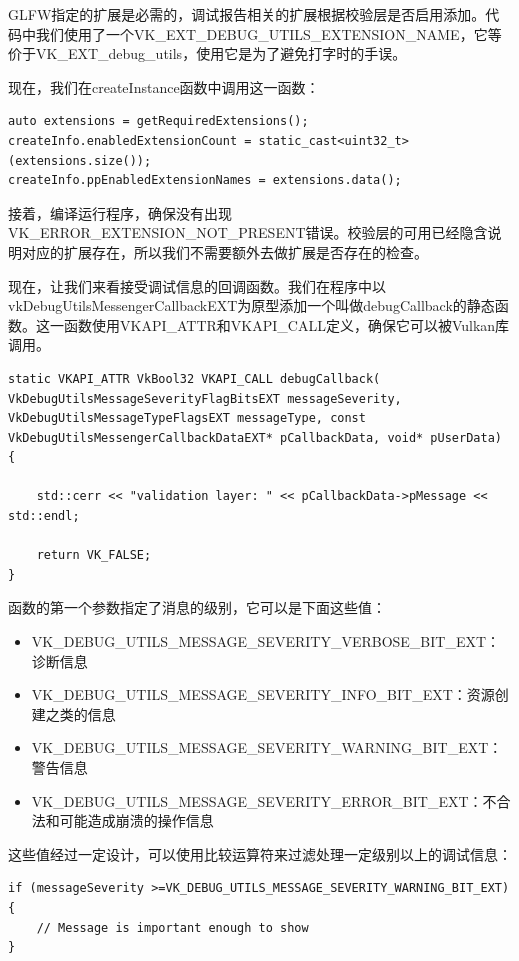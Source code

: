 \documentclass{ctexart}
\begin{document}
GLFW指定的扩展是必需的，调试报告相关的扩展根据校验层是否启用添加。代码中我们使用了一个VK\_EXT\_DEBUG\_UTILS\_EXTENSION\_NAME，它等价于VK\_EXT\_debug\_utils，使用它是为了避免打字时的手误。

现在，我们在createInstance函数中调用这一函数：

\begin{lstlisting}[language={[ANSI]C}]
auto extensions = getRequiredExtensions();
createInfo.enabledExtensionCount = static_cast<uint32_t>(extensions.size());
createInfo.ppEnabledExtensionNames = extensions.data();
\end{lstlisting}

接着，编译运行程序，确保没有出现VK\_ERROR\_EXTENSION\_NOT\_PRESENT错误。校验层的可用已经隐含说明对应的扩展存在，所以我们不需要额外去做扩展是否存在的检查。

现在，让我们来看接受调试信息的回调函数。我们在程序中以vkDebugUtilsMessengerCallbackEXT为原型添加一个叫做debugCallback的静态函数。这一函数使用VKAPI\_ATTR和VKAPI\_CALL定义，确保它可以被Vulkan库调用。

\begin{lstlisting}[language={[ANSI]C}]
static VKAPI_ATTR VkBool32 VKAPI_CALL debugCallback( VkDebugUtilsMessageSeverityFlagBitsEXT messageSeverity, VkDebugUtilsMessageTypeFlagsEXT messageType, const VkDebugUtilsMessengerCallbackDataEXT* pCallbackData, void* pUserData) {

	std::cerr << "validation layer: " << pCallbackData->pMessage << std::endl;

	return VK_FALSE;
}
\end{lstlisting}

函数的第一个参数指定了消息的级别，它可以是下面这些值：

\begin{itemize}
	\item VK\_DEBUG\_UTILS\_MESSAGE\_SEVERITY\_VERBOSE\_BIT\_EXT：诊断信息
	\item VK\_DEBUG\_UTILS\_MESSAGE\_SEVERITY\_INFO\_BIT\_EXT：资源创建之类的信息
	\item VK\_DEBUG\_UTILS\_MESSAGE\_SEVERITY\_WARNING\_BIT\_EXT：警告信息
	\item VK\_DEBUG\_UTILS\_MESSAGE\_SEVERITY\_ERROR\_BIT\_EXT：不合法和可能造成崩溃的操作信息
\end{itemize}

这些值经过一定设计，可以使用比较运算符来过滤处理一定级别以上的调试信息：

\begin{lstlisting}[language={[ANSI]C}]
if (messageSeverity >=VK_DEBUG_UTILS_MESSAGE_SEVERITY_WARNING_BIT_EXT) {
	// Message is important enough to show
}
\end{lstlisting}
\end{document}
